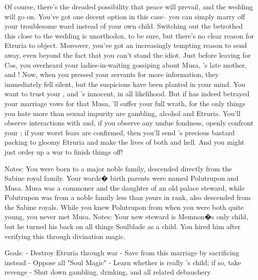 \documentclass[char]{Kos}
\begin{document}
Of course, there's the dreaded possibility that peace will prevail, and the wedding will go on. You've got one decent option in this case-- you can simply marry off your troublesome ward instead of your own child. Switching out the betrothed this close to the wedding is unorthodox, to be sure, but there's no clear reason for Etruria to object. Moreover, you've got an increasingly tempting reason to send \cWard{\them} away, even beyond the fact that you can't stand the idiot. Just before leaving for Cos, you overheard your ladies-in-waiting gossiping about Musa, \cWard{\nickname}'s late mother, and \cScythiaKing{}! Now, when you pressed your servants for more information, they immediately fell silent, but the suspicions have been planted in your mind. You want to trust your \cScythiaKing{\spouse}, and \cScythiaKing{\they}'s innocent, in all likelihood. But if \cScythiaKing{} has indeed betrayed your marriage vows for that Musa, \cScythiaKing{\they}'ll suffer your full wrath, for the only things you hate more than sexual impurity are gambling, alcohol and Etruria. You'll observe \cScythiaKing{\their} interactions with \cWard{\nickname} and, if you observe any undue fondness, openly confront your \cScythiaKing{\spouse}; if your worst fears are confirmed, then you'll  send \cScythiaKing{}'s precious bastard packing to gloomy Etruria and make the lives of both \cScythiaKing{\parent} and \cWard{\child} hell. And you might just order up a war to finish things off! 

Notes: You were born to a major noble family, descended directly from the Sabine royal family. Your wards� birth parents were named Polutrupon and Musa. Musa was a commoner and the daughter of an old palace steward, while Polutrupon was from a noble family less than yours in rank, also descended from the Sabine royals. While you knew Polutrupon from when you were both quite young, you never met Musa.
Notes: Your new steward is Memnon�s only child, but he turned his back on all things Soulblade as a child. You hired him after verifying this through divination magic. 

Goals:
- Destroy Etruria through war
- Save \cBride{\child} from this marriage by sacrificing \cWard{\nickname} instead
- Oppose all "Soul Magic"
- Learn whether \cWard{\nickname} is really \cScythiaKing{\nickname}'s child; if so, take revenge
- Shut down gambling, drinking, and all related debauchery
\end{document}
